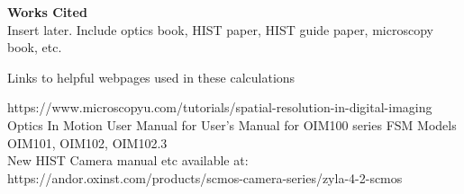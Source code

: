 \newpage
\begin{center}
    \textbf{Works Cited}\\
    Insert later. Include optics book, HIST paper, HIST guide paper, microscopy book, etc.
\end{center}
\begin{center}
    Links to helpful webpages used in these calculations
\end{center}
https://www.microscopyu.com/tutorials/spatial-resolution-in-digital-imaging\\
Optics In Motion User Manual for User’s Manual for OIM100 series FSM Models OIM101, OIM102, OIM102.3\\
New HIST Camera manual etc available at: https://andor.oxinst.com/products/scmos-camera-series/zyla-4-2-scmos